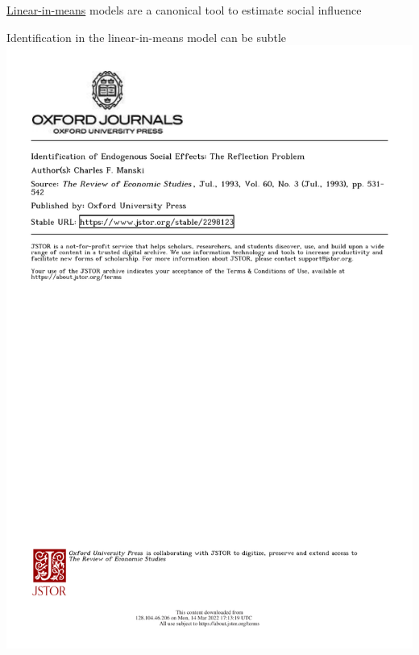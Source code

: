 \documentclass[aspectratio=169]{beamer}
\theoremstyle{remark}
\begin{document}
\begin{frame}{\underline{Linear-in-means} models are a canonical tool to estimate social influence}
\end{frame}

\begin{frame}{Identification in the linear-in-means model can be subtle}
    \centering
    \includegraphics[height=0.95\textheight, page=2, trim={0 14cm 0 0}, clip]{./papers/manski.pdf}
\end{frame}
\end{document}
